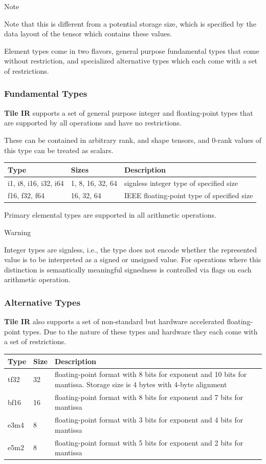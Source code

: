 \documentclass{article}
\begin{document}
Note


Note that this is different from a potential storage size, which is specified by the data layout of the tensor which contains these values.


Element types come in two flavors, general purpose fundamental types that come without restriction, and specialized alternative types which each come with a set of restrictions.


\subsubsection{Fundamental Types}

\textbf{Tile IR} supports a set of general purpose integer and floating-point types that are supported by all operations and have no restrictions.

These can be contained in arbitrary rank, and shape tensors, and 0-rank values of this type can be treated as scalars.


\begin{longtable}{l|l|l}
\hline
Type & Sizes & Description \\ \hline
i1, i8, i16, i32, i64 & 1, 8, 16, 32, 64 & signless integer type of specified size \\ \hline
f16, f32, f64 & 16, 32, 64 & IEEE floating-point type of specified size \\ \hline
\end{longtable}

Primary elemental types are supported in all arithmetic operations.


Warning


Integer types are signless, i.e., the type does not encode whether the represented value is to be interpreted as a signed or unsigned value. For operations where this distinction is semantically meaningful signedness is controlled via flags on each arithmetic operation.



\subsubsection{Alternative Types}

\textbf{Tile IR} also supports a set of non-standard but hardware accelerated floating-point types. Due to the nature of these types and hardware they each come with a set of restrictions.


\begin{longtable}{l|l|l}
\hline
Type & Size & Description \\ \hline
tf32 & 32 & floating-point format with 8 bits for exponent and 10 bits for mantissa. Storage size is 4 bytes with 4-byte alignment \\ \hline
bf16 & 16 & floating-point format with 8 bits for exponent and 7 bits for mantissa \\ \hline
e3m4 & 8 & floating-point format with 3 bits for exponent and 4 bits for mantissa \\ \hline
e5m2 & 8 & floating-point format with 5 bits for exponent and 2 bits for mantissa \\ \hline
\end{longtable}
\end{document}
